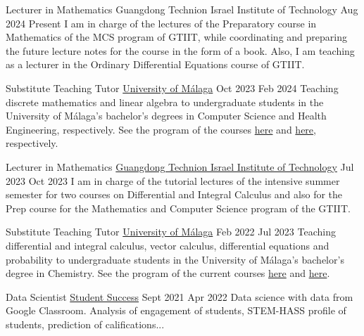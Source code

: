\nopagebreak
\begin{employment}
		{Lecturer in Mathematics}
		{Guangdong Technion Israel Institute of Technology}
		{Aug 2024}
		{Present}
		{I am in charge of the lectures of the Preparatory course in Mathematics of the MCS program of GTIIT, while coordinating and preparing the future lecture notes for the course in the form of a book. Also, I am teaching as a lecturer in the Ordinary Differential Equations course of GTIIT.}
\end{employment}

\begin{employment}
    {Substitute Teaching Tutor}
    {\href{https://www.uma.es/}{University of Málaga}}
    {Oct 2023}
    {Feb 2024}
    {Teaching discrete mathematics and linear algebra to undergraduate students in the University of Málaga's bachelor's degrees in Computer Science and Health Engineering, respectively. See the program of the courses \href{https://sara.uma.es/ht/2023/ProgramasAsignaturas_Titulacion_5389_AsigUMA_55366.pdf}{here} and \href{https://sara.uma.es/ht/2023/ProgramasAsignaturas_Titulacion_5157_AsigUMA_53012.pdf}{here}, respectively.}
\end{employment}

\begin{employment}
		{Lecturer in Mathematics}
		{\href{https://www.gtiit.edu.cn/en/}{Guangdong Technion Israel Institute of Technology}}
		{Jul 2023}
		{Oct 2023}
		{I am in charge of the tutorial lectures of the intensive summer semester for two courses on Differential and Integral Calculus and also for the Prep course for the Mathematics and Computer Science program of the GTIIT.}
\end{employment}

\begin{employment}
    {Substitute Teaching Tutor}
    {\href{https://www.uma.es/}{University of Málaga}}
    {Feb 2022}
    {Jul 2023}
    {Teaching differential and integral calculus, vector calculus, differential equations and probability to undergraduate students in the University of Málaga's bachelor's degree in Chemistry. See the program of the current courses \href{https://oas.sci.uma.es:8443/ht/2022/ProgramasAsignaturas_Titulacion_5004_AsigUMA_51634.pdf}{here} and \href{https://oas.sci.uma.es:8443/ht/2022/ProgramasAsignaturas_Titulacion_5004_AsigUMA_51639.pdf}{here}.}
\end{employment}

\begin{employment}
    {Data Scientist}
    {\href{https://studentsuccess.app/es/}{Student Success}}
    {Sept 2021}
    {Apr 2022}
    {Data science with data from Google Classroom. Analysis of  engagement of students, STEM-HASS profile of students, prediction of  califications...}
\end{employment}

